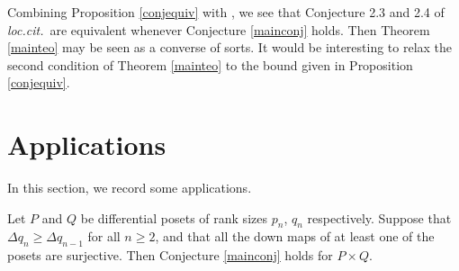 \documentclass[ALCO, Unicode]{cedram}
\begin{document}
   


\begin{remark}   Combining Proposition \ref{conjequiv} with  \cite[Proposition 2.5]{Miller}, we see that Conjecture 2.3 and 2.4 of \emph{loc.cit.}\ are equivalent whenever Conjecture \ref{mainconj} holds. Then  Theorem \ref{mainteo} may  be seen as a converse of sorts.  It would be interesting to relax the second condition of Theorem \ref{mainteo} to the  bound given in Proposition \ref{conjequiv}. 
\end{remark}  

             
\section{Applications}        

In this section, we  record some  applications.    
\begin{theorem} \label{Cartesian}    Let $ P $ and $ Q $ be differential posets of  rank sizes $ p_{n} $, $ q_{n} $ respectively. Suppose that $ \Delta q_{n} \geq \Delta q_{n-1}    $ for all $ n \geq 2 $, and that all the down maps of at least one of the posets are surjective. Then  Conjecture \ref{mainconj} holds for  $ P  \times  Q    $. 
\end{theorem}     
\end{document}
